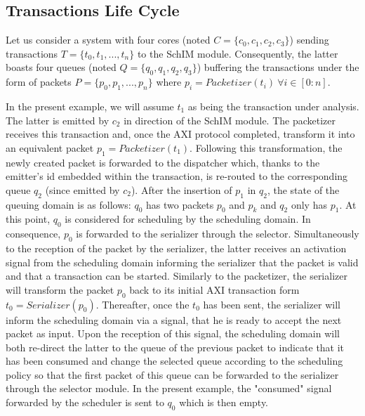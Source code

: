     \subsection{Transactions Life Cycle}
        \label{subsec:transaction-life-cycle}
        Let us consider a system with four cores (noted $C = \{c_{0}, c_{1}, c_{2}, c_{3}\}$) sending transactions $T = \{t_{0}, t_{1}, ..., t_{n}\}$ to the SchIM module.
        Consequently, the latter boasts four queues (noted $Q = \{q_{0}, q_{1}, q_{2}, q_{3}\}$) buffering the transactions under the form of packets $P = \{p_{0}, p_{1}, ..., p_{n}\}$ where $p_{i} = Packetizer(t_{i})~\forall i \in [0 : n]$.

        In the present example, we will assume $t_{1}$ as being the transaction under analysis.
        The latter is emitted by $c_{2}$ in direction of the SchIM module.
        The packetizer receives this transaction and, once the AXI protocol completed, transform it into an equivalent packet $p_{1} = Packetizer(t_{1})$.
        Following this transformation, the newly created packet is forwarded to the dispatcher which, thanks to the emitter's id embedded within the transaction, is re-routed to the corresponding queue $q_{2}$ (since emitted by $c_{2}$).
        After the insertion of $p_{1}$ in $q_{2}$, the state of the queuing domain is as follows: $q_{0}$ has two packets $p_{0}$ and $p_{k}$ and $q_{2}$ only has $p_{1}$.
        At this point, $q_{0}$ is considered for scheduling by the scheduling domain.
        In consequence, $p_{0}$ is forwarded to the serializer through the selector.
        Simultaneously to the reception of the packet by the serializer, the latter receives an activation signal from the scheduling domain informing the serializer that the packet is valid and that a transaction can be started.
        Similarly to the packetizer, the serializer will transform the packet $p_{0}$ back to its initial AXI transaction form $t_{0} = Serializer(p_{0})$.
        Thereafter, once the $t_{0}$ has been sent, the serializer will inform the scheduling domain via a signal, that he is ready to accept the next packet as input.
        Upon the reception of this signal, the scheduling domain will both re-direct the latter to the queue of the previous packet to indicate that it has been consumed and change the selected queue according to the scheduling policy so that the first packet of this queue can be forwarded to the serializer through the selector module.
        In the present example, the "consumed" signal forwarded by the scheduler is sent to $q_{0}$ which is then empty.
